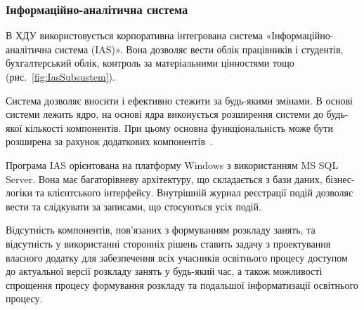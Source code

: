 \subsubsection{Інформаційно-аналітична система} \label{subs:ias}

В ХДУ використовується корпоративна інтегрована система «Інформаційно-аналітична система (IAS)». Вона дозволяє вести облік працівників і студентів, бухгалтерський облік, контроль за матеріальними цінностями тощо (рис.~\ref{fig:IasSubsustem}). 

		
Система дозволяє вносити і ефективно стежити за будь-якими змінами. В основі системи лежить ядро, на основі ядра виконується розширення системи до будь-якої кількості компонентів. При цьому основна функціональність може бути розширена за рахунок додаткових компонентів~\cite{львов2007інформаційна}. 

Програма IAS орієнтована на платформу Windows з використанням MS SQL Server. Вона має багаторівневу архітектуру, що складається з бази даних, бізнес-логіки та клієнтського інтерфейсу. Внутрішній журнал реєстрації подій дозволяє вести та слідкувати за записами, що стосуються усіх подій.

Відсутність компонентів, пов’язаних з формуванням розкладу занять, та відсутність у використанні сторонніх рішень ставить задачу з проектування власного додатку для забезпечення всіх учасників освітнього процесу доступом до актуальної версії розкладу занять у будь-який час, а також можливості спрощення процесу формування розкладу та подальшої інформатизації освітнього процесу.